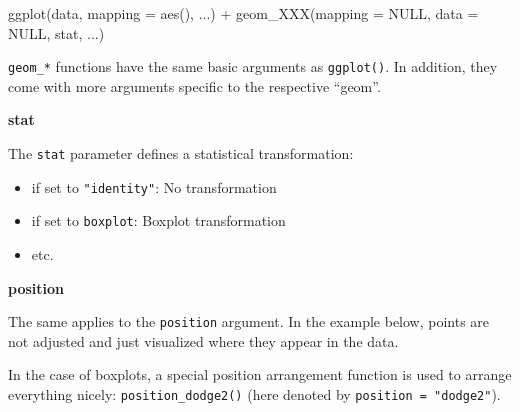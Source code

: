 \documentclass[]{book}
\newenvironment{Shaded}{}{}
\newcommand{\DataTypeTok}[1]{#1}
\newcommand{\KeywordTok}[1]{\textcolor[rgb]{0.00,0.00,1.00}{#1}}
\newcommand{\NormalTok}[1]{#1}
\newcommand{\OperatorTok}[1]{#1}
\newcommand{\OtherTok}[1]{\textcolor[rgb]{1.00,0.25,0.00}{#1}}
\newcommand{\StringTok}[1]{\textcolor[rgb]{0.00,0.50,0.50}{#1}}
\begin{document}
\begin{Shaded}
\begin{Highlighting}[]
\KeywordTok{ggplot}\NormalTok{(data, }\DataTypeTok{mapping =} \KeywordTok{aes}\NormalTok{(), ...) }\OperatorTok{+}
\StringTok{  }\KeywordTok{geom_XXX}\NormalTok{(}\DataTypeTok{mapping =} \OtherTok{NULL}\NormalTok{, }\DataTypeTok{data =} \OtherTok{NULL}\NormalTok{, stat, ...)}
\end{Highlighting}
\end{Shaded}

\texttt{geom\_*} functions have the same basic arguments as \texttt{ggplot()}.
In addition, they come with more arguments specific to the respective ``geom''.

\textbf{stat}

The \texttt{stat} parameter defines a statistical transformation:

\begin{itemize}
\item
  if set to \texttt{"identity"}: No transformation
\item
  if set to \texttt{boxplot}: Boxplot transformation
\item
  etc.
\end{itemize}

\textbf{position}

The same applies to the \texttt{position} argument.
In the example below, points are not adjusted and just visualized where they appear in the data.

In the case of boxplots, a special position arrangement function is used to arrange everything nicely: \texttt{position\_dodge2()} (here denoted by \texttt{position\ =\ "dodge2"}).
\end{document}
